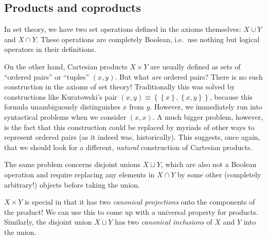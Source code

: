 \subsection{Products and coproducts \label{Sec.Products}}

In set theory, we have two set operations defined in the axioms themselves:
$X\cup Y$ and $X\cap Y$. These operations are completely Boolean,
i.e.\ use nothing but logical operators in their definitions. 

On the other hand, Cartesian products $X\times Y$ are usually defined
as sets of ``ordered pairs'' or ``tuples'' $(x,y)$. But what
\emph{are} ordered pairs? There is no such construction in the axioms of
set theory! Traditionally this was solved by constructions like Kuratowski's
pair $\left(x,y\right)\equiv\left\{ \left\{ x\right\} ,\left\{ x,y\right\} \right\} $,
because this formula unambiguously distinguishes $x$ from $y$. However,
we immediately run into syntactical problems when we consider $\left(x,x\right)$.
A much bigger problem, however, is the fact that this construction
could be replaced by myriads of other ways to represent ordered pairs
(as it indeed was, historically). This suggests, once again, that
we should look for a different, \emph{natural} construction of Cartesian
products.

The same problem concerns disjoint unions $X\sqcup Y$, which are
also not a Boolean operation and require replacing any elements in
$X\cap Y$ by some other (completely arbitrary!) objects before taking
the union.

$X\times Y$ is special in that it has two \emph{canonical projections}
onto the components of the product! We can use this to come up with
a universal property for products. Similarly, the disjoint union $X\sqcup Y$
has two \emph{canonical inclusions} of $X$ and $Y$ into the union.

